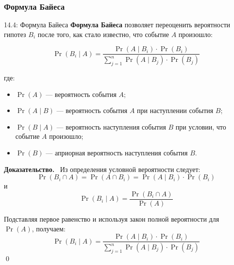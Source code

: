 \documentclass[a4paper,12pt]{article}
\newcommand{\myproof}{\textbf{Доказательство.}\ }
\begin{document}
	\subsubsection{Формула Байеса}
	
	\begin{definitionbox}{14.4: Формула Байеса}
		\textbf{Формула Байеса} позволяет переоценить вероятности гипотез \(B_i\) после того, как стало известно, что событие \(A\) произошло:
		
		\[ \Pr(B_i \mid A) = \frac{\Pr(A \mid B_i) \cdot \Pr(B_i)}{\sum_{j=1}^n \Pr(A \mid B_j) \cdot \Pr(B_j)} \]
		
		где:
		\begin{itemize}
			\item \(\Pr(A)\) — вероятность события \(A\);
			\item \(\Pr(A \mid B)\) — вероятность события \(A\) при наступлении события \(B\);
			\item \(\Pr(B \mid A)\) — вероятность наступления события \(B\) при условии, что событие \(A\) произошло;
			\item \(\Pr(B)\) — априорная вероятность наступления события \(B\).
		\end{itemize}
	\end{definitionbox}
	
	\myproof
	Из определения условной вероятности следует:
	\[ \Pr(B_i \cap A) = \Pr(A \cap B_i) = \Pr(A \mid B_i) \cdot \Pr(B_i) \]
	и
	\[ \Pr(B_i \mid A) = \frac{\Pr(B_i \cap A)}{\Pr(A)} \]
	
	Подставляя первое равенство и используя закон полной вероятности для \(\Pr(A)\), получаем:
	\[ \Pr(B_i \mid A) = \frac{\Pr(A \mid B_i) \cdot \Pr(B_i)}{\sum_{j=1}^n \Pr(A \mid B_j) \cdot \Pr(B_j)} \]
	\qed
	
\end{document}
